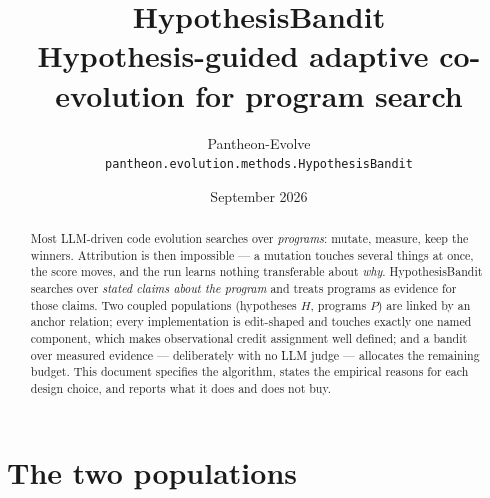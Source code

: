 \documentclass[11pt]{article}
\title{\textbf{HypothesisBandit}\\[2mm]
\large Hypothesis-guided adaptive co-evolution for program search}
\author{Pantheon-Evolve \\ \small\texttt{pantheon.evolution.methods.HypothesisBandit}}
\date{September 2026}
\begin{document}
\maketitle

\begin{abstract}
\noindent Most LLM-driven code evolution searches over \emph{programs}: mutate, measure, keep the
winners. Attribution is then impossible --- a mutation touches several things at once, the score
moves, and the run learns nothing transferable about \emph{why}. HypothesisBandit searches over
\emph{stated claims about the program} and treats programs as evidence for those claims. Two
coupled populations (hypotheses $H$, programs $P$) are linked by an anchor relation; every
implementation is edit-shaped and touches exactly one named component, which makes observational
credit assignment well defined; and a bandit over measured evidence --- deliberately with no LLM
judge --- allocates the remaining budget. This document specifies the algorithm, states the
empirical reasons for each design choice, and reports what it does and does not buy.
\end{abstract}

\section{The two populations}

\begin{center}
\end{center}
\end{document}
